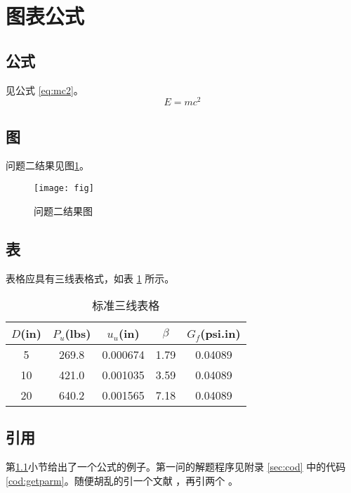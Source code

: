\section{图表公式}
\subsection{公式}\label{sec:eq}
见公式 \ref{eq:mc2}。
\begin{equation}\label{eq:mc2}
E = m c^2
\end{equation}
\subsection{图}\label{sec:fig}
问题二结果见图\ref{fig:prob1}。
\begin{figure}[!htb]
\centering
\texttt{[image: fig]}
\caption{问题二结果图}\label{fig:prob1}
\end{figure}

\subsection{表}
表格应具有三线表格式，如表 \ref{tab:three} 所示。
\begin{table}[!htb]
\caption{标准三线表格}\label{tab:three} \centering
\begin{tabular}{ccccc}
\toprule[1.5pt]
$D$(in) & $P_u$(lbs) & $u_u$(in) & $\beta$ & $G_f$(psi.in)\\
\midrule[1pt]
 5 & 269.8 & 0.000674 & 1.79 & 0.04089\\
10 & 421.0 & 0.001035 & 3.59 & 0.04089\\
20 & 640.2 & 0.001565 & 7.18 & 0.04089\\
\bottomrule[1.5pt]
\end{tabular}
\end{table}

\subsection{引用}
第\ref{sec:eq}小节给出了一个公式的例子。第一问的解题程序见附录 \ref{sec:cod} 中的代码 \ref{cod:getparm}。随便胡乱的引一个文献 \cite{Beauregard2005}，再引两个 \cite{Hicks2006,王永庆1998}。
